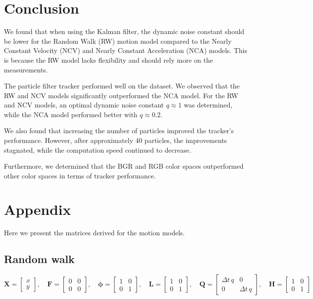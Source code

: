 \documentclass[9pt]{IEEEtran}
\begin{document}
\section{Conclusion}
We found that when using the Kalman filter, the dynamic noise constant should be lower for 
the Random Walk (RW) motion model compared to the Nearly Constant Velocity (NCV) and Nearly
 Constant Acceleration (NCA) models. This is because the RW model lacks flexibility and should
  rely more on the measurements.

The particle filter tracker performed well on the dataset. We observed that the RW and NCV models 
significantly outperformed the NCA model. For the RW and NCV models, an optimal dynamic noise constant 
\(q \approx 1\) was determined, while the NCA model performed better with \(q \approx 0.2\).

We also found that increasing the number of particles improved the tracker's performance. However,
 after approximately 40 particles, the improvements stagnated, while the computation speed continued 
 to decrease.

Furthermore, we determined that the BGR and RGB color spaces outperformed other color spaces in terms 
of tracker performance.


\clearpage
\newpage
\section{Appendix}
Here we present the matrices derived for the motion models.
\subsection{Random walk}
\[
\mathbf{X} = \begin{bmatrix} x \\ y \end{bmatrix}, \quad
\mathbf{F} = \begin{bmatrix} 0 & 0 \\ 0 & 0 \end{bmatrix}, \quad
\boldsymbol{\phi} = \begin{bmatrix} 1 & 0 \\ 0 & 1 \end{bmatrix}, \quad
\mathbf{L} = \begin{bmatrix} 1 & 0 \\ 0 & 1 \end{bmatrix}, \quad
\mathbf{Q} = \begin{bmatrix} \Delta t\,q & 0 \\ 0 & \Delta t\,q \end{bmatrix}, \quad
\mathbf{H} = \begin{bmatrix} 1 & 0 \\ 0 & 1 \end{bmatrix}
\]
\end{document}
